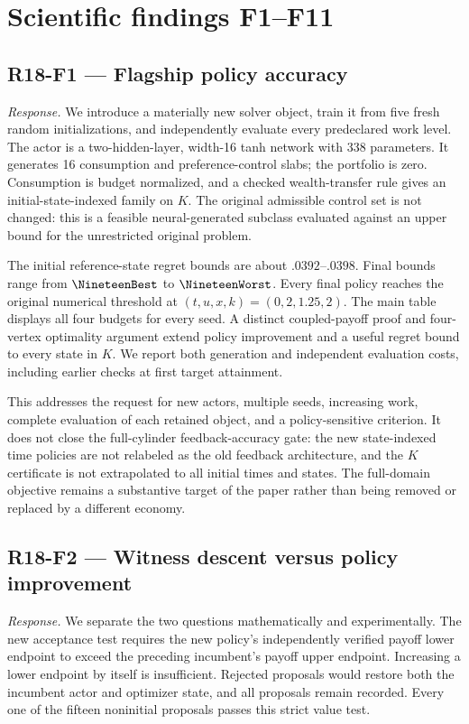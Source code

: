 \section{Scientific findings F1--F11}
\subsection{R18-F1 --- Flagship policy accuracy}
\emph{Response.} We introduce a materially new solver object, train it from five fresh random initializations, and independently evaluate every predeclared work level. The actor is a two-hidden-layer, width-16 tanh network with 338 parameters. It generates 16 consumption and preference-control slabs; the portfolio is zero. Consumption is budget normalized, and a checked wealth-transfer rule gives an initial-state-indexed family on $K$. The original admissible control set is not changed: this is a feasible neural-generated subclass evaluated against an upper bound for the unrestricted original problem.

The initial reference-state regret bounds are about $.0392$--$.0398$. Final bounds range from $\NineteenBest$ to $\NineteenWorst$. Every final policy reaches the original numerical threshold at $(t,u,x,k)=(0,2,1.25,2)$. The main table displays all four budgets for every seed. A distinct coupled-payoff proof and four-vertex optimality argument extend policy improvement and a useful regret bound to every state in $K$. We report both generation and independent evaluation costs, including earlier checks at first target attainment.

This addresses the request for new actors, multiple seeds, increasing work, complete evaluation of each retained object, and a policy-sensitive criterion. It does not close the full-cylinder feedback-accuracy gate: the new state-indexed time policies are not relabeled as the old feedback architecture, and the $K$ certificate is not extrapolated to all initial times and states. The full-domain objective remains a substantive target of the paper rather than being removed or replaced by a different economy.

\subsection{R18-F2 --- Witness descent versus policy improvement}
\emph{Response.} We separate the two questions mathematically and experimentally. The new acceptance test requires the new policy's independently verified payoff lower endpoint to exceed the preceding incumbent's payoff upper endpoint. Increasing a lower endpoint by itself is insufficient. Rejected proposals would restore both the incumbent actor and optimizer state, and all proposals remain recorded. Every one of the fifteen noninitial proposals passes this strict value test.

